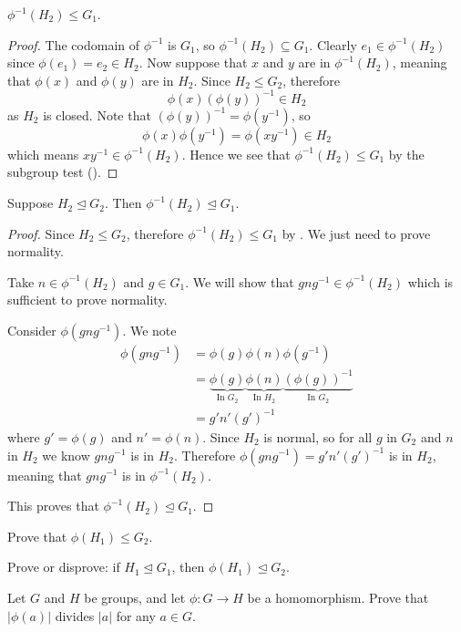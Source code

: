 \begin{proposition}\label{prop-homomorphism-inverse-is-subgroup}
    $\phi^{-1}(H_2) \leq G_1$.
\end{proposition}
\begin{proof}
    The codomain of $\phi^{-1}$ is $G_1$, so $\phi^{-1}(H_2) \subseteq G_1$. Clearly $e_1 \in \phi^{-1}(H_2)$ since $\phi(e_1) = e_2 \in H_2$. Now suppose that $x$ and $y$ are in $\phi^{-1}(H_2)$, meaning that $\phi(x)$ and $\phi(y)$ are in $H_2$. Since $H_2 \leq G_2$, therefore
    \[
        \phi(x)\left(\phi(y)\right)^{-1} \in H_2
    \]
    as $H_2$ is closed. Note that $\left(\phi(y)\right)^{-1} = \phi(y^{-1})$, so
    \[
        \phi(x)\phi(y^{-1}) = \phi(xy^{-1}) \in H_2
    \]
    which means $xy^{-1} \in \phi^{-1}(H_2)$. Hence we see that $\phi^{-1}(H_2) \leq G_1$ by the subgroup test ().
\end{proof}

\begin{proposition}
    Suppose $H_2 \unlhd G_2$. Then $\phi^{-1}(H_2) \unlhd G_1$.
\end{proposition}
\begin{proof}
    Since $H_2 \leq G_2$, therefore $\phi^{-1}(H_2) \leq G_1$ by . We just need to prove normality.

    Take $n \in \phi^{-1}(H_2)$ and $g \in G_1$. We will show that $gng^{-1} \in \phi^{-1}(H_2)$ which is sufficient to prove normality.

    Consider $\phi(gng^{-1})$. We note
    \begin{align*}
        \phi(gng^{-1}) &= \phi(g)\phi(n)\phi(g^{-1}) \\
        &= \underbrace{\phi(g)}_{\text{In }G_2} \underbrace{\phi(n)}_{\text{In }H_2} \underbrace{\left(\phi(g)\right)^{-1}}_{\text{In }G_2}\\
        &= g'n'(g')^{-1}
    \end{align*}
    where $g' = \phi(g)$ and $n' = \phi(n)$. Since $H_2$ is normal, so for all $g$ in $G_2$ and $n$ in $H_2$ we know $gng^{-1}$ is in $H_2$. Therefore $\phi(gng^{-1}) = g'n'(g')^{-1}$ is in $H_2$, meaning that $gng^{-1}$ is in $\phi^{-1}(H_2)$.

    This proves that $\phi^{-1}(H_2) \unlhd G_1$.
\end{proof}

\begin{exercise}\label{exercise-homomorphism-image-is-subgroup}
    Prove that $\phi(H_1) \leq G_2$.
\end{exercise}
\begin{exercise}
    Prove or disprove: if $H_1 \unlhd G_1$, then $\phi(H_1) \unlhd G_2$.
\end{exercise}
\begin{exercise}\label{exercise-order-of-homomorphism-divides-order}
    Let $G$ and $H$ be groups, and let $\phi: G \to H$ be a homomorphism. Prove that $|\phi(a)|$ divides $|a|$ for any $a \in G$.
\end{exercise}

